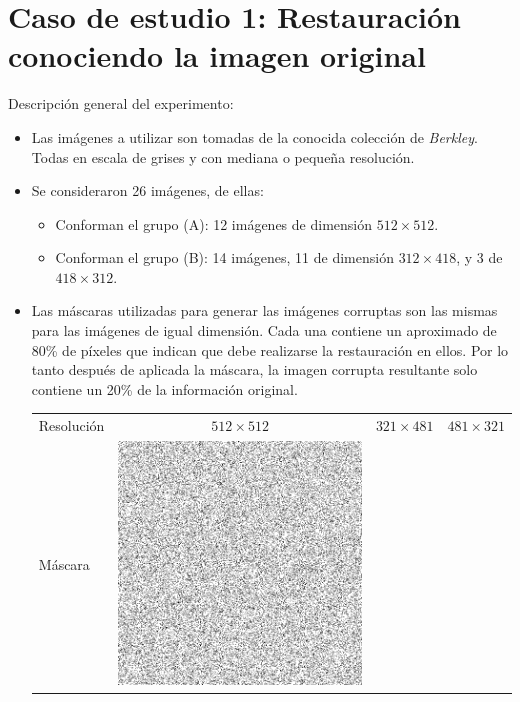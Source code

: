 \section{Caso de estudio 1: Restauraci\'on conociendo la imagen original}

Descripci\'on general del experimento:
\begin{itemize}
	\item Las im\'agenes a utilizar son tomadas de la conocida colecci\'on de \textit{Berkley}. Todas en escala de grises y con mediana o pequeña resoluci\'on.
	\item Se consideraron 26 im\'agenes, de ellas:
	\begin{itemize}
		\item Conforman el grupo (A): 12 im\'agenes de dimensi\'on $512 \times 512$.
		\item Conforman el grupo (B): 14 im\'agenes, 11 de dimensi\'on $312 \times 418$, y 3 de $418 \times 312$.
	\end{itemize}
	\item Las m\'ascaras utilizadas para generar las im\'agenes corruptas son las mismas para las im\'agenes de igual dimensión. Cada una contiene un aproximado de 80\% de p\'ixeles que indican que debe realizarse la restauraci\'on en ellos. Por lo tanto despu\'es de aplicada la m\'ascara, la imagen corrupta resultante solo contiene un 20\% de la informaci\'on original.
	\begin{table}[H]
		\centering
		\begin{tabular}{|l|ccc|}\hline
		Resoluci\'on & $512 \times 512$ & $321 \times 481$ & $481 \times 321$ \\
		M\'ascara &
		\includegraphics[scale=0.2]{Experiments/mask_512_512.tif} &

\end{tabular}
\end{table}
\end{itemize}
